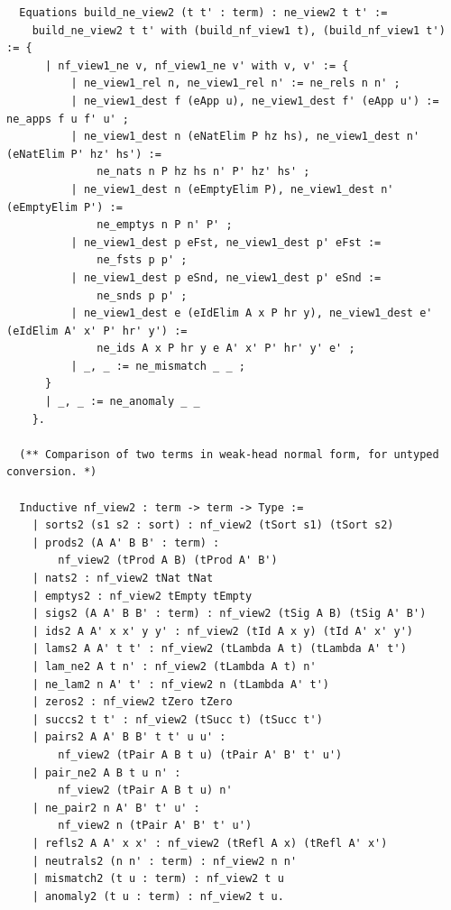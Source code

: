 \begin{lstlisting}
  Equations build_ne_view2 (t t' : term) : ne_view2 t t' :=
    build_ne_view2 t t' with (build_nf_view1 t), (build_nf_view1 t') := {
      | nf_view1_ne v, nf_view1_ne v' with v, v' := {
          | ne_view1_rel n, ne_view1_rel n' := ne_rels n n' ;
          | ne_view1_dest f (eApp u), ne_view1_dest f' (eApp u') := ne_apps f u f' u' ;
          | ne_view1_dest n (eNatElim P hz hs), ne_view1_dest n' (eNatElim P' hz' hs') :=
              ne_nats n P hz hs n' P' hz' hs' ;
          | ne_view1_dest n (eEmptyElim P), ne_view1_dest n' (eEmptyElim P') :=
              ne_emptys n P n' P' ;
          | ne_view1_dest p eFst, ne_view1_dest p' eFst :=
              ne_fsts p p' ;
          | ne_view1_dest p eSnd, ne_view1_dest p' eSnd :=
              ne_snds p p' ;
          | ne_view1_dest e (eIdElim A x P hr y), ne_view1_dest e' (eIdElim A' x' P' hr' y') :=
              ne_ids A x P hr y e A' x' P' hr' y' e' ;
          | _, _ := ne_mismatch _ _ ;
      }
      | _, _ := ne_anomaly _ _
    }.

  (** Comparison of two terms in weak-head normal form, for untyped conversion. *)

  Inductive nf_view2 : term -> term -> Type :=
    | sorts2 (s1 s2 : sort) : nf_view2 (tSort s1) (tSort s2)
    | prods2 (A A' B B' : term) :
        nf_view2 (tProd A B) (tProd A' B')
    | nats2 : nf_view2 tNat tNat
    | emptys2 : nf_view2 tEmpty tEmpty
    | sigs2 (A A' B B' : term) : nf_view2 (tSig A B) (tSig A' B')
    | ids2 A A' x x' y y' : nf_view2 (tId A x y) (tId A' x' y')
    | lams2 A A' t t' : nf_view2 (tLambda A t) (tLambda A' t')
    | lam_ne2 A t n' : nf_view2 (tLambda A t) n'
    | ne_lam2 n A' t' : nf_view2 n (tLambda A' t')
    | zeros2 : nf_view2 tZero tZero
    | succs2 t t' : nf_view2 (tSucc t) (tSucc t')
    | pairs2 A A' B B' t t' u u' :
        nf_view2 (tPair A B t u) (tPair A' B' t' u')
    | pair_ne2 A B t u n' :
        nf_view2 (tPair A B t u) n'
    | ne_pair2 n A' B' t' u' :
        nf_view2 n (tPair A' B' t' u')
    | refls2 A A' x x' : nf_view2 (tRefl A x) (tRefl A' x')
    | neutrals2 (n n' : term) : nf_view2 n n'
    | mismatch2 (t u : term) : nf_view2 t u
    | anomaly2 (t u : term) : nf_view2 t u.
    

\end{lstlisting}
